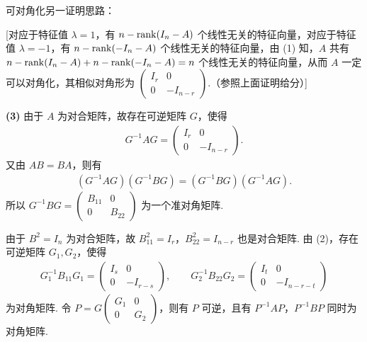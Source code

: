 \begin{solution}
可对角化另一证明思路：

[对应于特征值 $\lambda=1$，有 $n-\operatorname{rank}(I_n-A)$ 个线性无关的特征向量，对应于特征值 $\lambda=-1$，有 $n-\operatorname{rank}(-I_n-A)$ 个线性无关的特征向量，由 (1) 知，$A$ 共有 $n-\operatorname{rank}(I_n-A)+n-\operatorname{rank}(-I_n-A)=n$ 个线性无关的特征向量，从而 $A$ 一定可以对角化，其相似对角形为 $\begin{pmatrix} I_r & 0\\ 0 & -I_{n-r}\end{pmatrix}$.（参照上面证明给分）]

\textbf{(3)} 由于 $A$ 为对合矩阵，故存在可逆矩阵 $G$，使得
\begin{align*}
G^{-1}AG=\begin{pmatrix}
  I_r & 0\\
  0 & -I_{n-r}
\end{pmatrix}.
\end{align*}
又由 $AB=BA$，则有
\begin{align*}
(G^{-1}AG)(G^{-1}BG)=(G^{-1}BG)(G^{-1}AG).
\end{align*}
所以 $G^{-1}BG=\begin{pmatrix} B_{11} & 0\\ 0 & B_{22}\end{pmatrix}$ 为一个准对角矩阵.

由于 $B^2=I_n$ 为对合矩阵，故 $B_{11}^2=I_r$，$B_{22}^2=I_{n-r}$ 也是对合矩阵. 由 (2)，存在可逆矩阵 $G_1,G_2$，使得
\begin{align*}
G_1^{-1}B_{11}G_1=\begin{pmatrix}
  I_s & 0\\
  0 & -I_{r-s}
\end{pmatrix},
\qquad
G_2^{-1}B_{22}G_2=\begin{pmatrix}
  I_t & 0\\
  0 & -I_{n-r-t}
\end{pmatrix}
\end{align*}
为对角矩阵. 令 $P=G\begin{pmatrix} G_1 & 0\\ 0 & G_2\end{pmatrix}$，则有 $P$ 可逆，且有 $P^{-1}AP$，$P^{-1}BP$ 同时为对角矩阵.
\end{solution}

